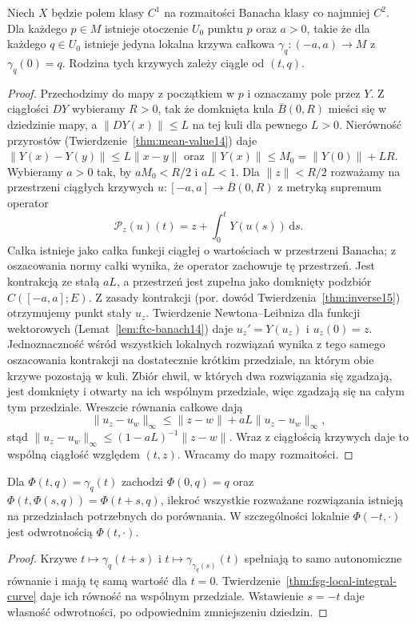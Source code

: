 \begin{twierdzenie}
\label{thm:fsg-local-integral-curve}
Niech $X$ będzie polem klasy $C^1$ na rozmaitości
Banacha klasy co najmniej $C^2$. Dla każdego $p\in M$
istnieje otoczenie $U_0$ punktu $p$ oraz $a>0$,
takie że dla każdego $q\in U_0$ istnieje jedyna lokalna
krzywa całkowa $\gamma_q:(-a,a)\to M$ z $\gamma_q(0)=q$.
Rodzina tych krzywych zależy ciągle od $(t,q)$.
\end{twierdzenie}
\begin{proof}
Przechodzimy do mapy z początkiem w $p$ i oznaczamy
pole przez $Y$. Z ciągłości $DY$ wybieramy $R>0$,
tak że domknięta kula $\overline B(0,R)$ mieści się
w dziedzinie mapy, a $\|DY(x)\|\le L$ na tej kuli
dla pewnego $L>0$. Nierówność przyrostów
(Twierdzenie~\ref{thm:mean-value14}) daje
$\|Y(x)-Y(y)\|\le L\|x-y\|$ oraz
$\|Y(x)\|\le M_0=\|Y(0)\|+LR$.
Wybieramy $a>0$ tak, by $aM_0<R/2$ i $aL<1$.
Dla $\|z\|<R/2$ rozważamy na przestrzeni ciągłych
krzywych $u:[-a,a]\to\overline B(0,R)$ z metryką
supremum operator
\[
 \mathcal P_z(u)(t)=z+\int_0^t Y(u(s))\,\mathrm ds.
\]
Całka istnieje jako całka funkcji ciągłej o wartościach
w przestrzeni Banacha; z oszacowania normy całki wynika,
że operator zachowuje tę przestrzeń. Jest kontrakcją
ze stałą $aL$, a przestrzeń jest zupełna jako domknięty
podzbiór $C([-a,a];E)$. Z zasady kontrakcji
(por. dowód Twierdzenia~\ref{thm:inverse15}) otrzymujemy
punkt stały $u_z$. Twierdzenie Newtona--Leibniza
dla funkcji wektorowych (Lemat~\ref{lem:ftc-banach14})
daje $u_z'=Y(u_z)$ i $u_z(0)=z$.
Jednoznaczność wśród wszystkich lokalnych rozwiązań
wynika z tego samego oszacowania kontrakcji na
dostatecznie krótkim przedziale, na którym obie krzywe
pozostają w kuli. Zbiór chwil, w których dwa rozwiązania
się zgadzają, jest domknięty i otwarty na ich wspólnym
przedziale, więc zgadzają się na całym tym przedziale.
Wreszcie równania całkowe dają
\[
 \|u_z-u_w\|_\infty
 \le \|z-w\|+aL\|u_z-u_w\|_\infty,
\]
stąd $\|u_z-u_w\|_\infty\le(1-aL)^{-1}\|z-w\|$.
Wraz z ciągłością krzywych daje to wspólną ciągłość
względem $(t,z)$. Wracamy do mapy rozmaitości.
\end{proof}

\begin{wniosek}
\label{cor:fsg-flow-law}
Dla $\Phi(t,q)=\gamma_q(t)$ zachodzi $\Phi(0,q)=q$ oraz
$\Phi(t,\Phi(s,q))=\Phi(t+s,q)$, ilekroć wszystkie
rozważane rozwiązania istnieją na przedziałach
potrzebnych do porównania. W szczególności lokalnie
$\Phi(-t,\cdot)$ jest odwrotnością $\Phi(t,\cdot)$.
\end{wniosek}
\begin{proof}
Krzywe $t\mapsto\gamma_q(t+s)$ i
$t\mapsto\gamma_{\gamma_q(s)}(t)$ spełniają to samo
autonomiczne równanie i mają tę samą wartość dla $t=0$.
Twierdzenie~\ref{thm:fsg-local-integral-curve} daje ich
równość na wspólnym przedziale. Wstawienie $s=-t$
daje własność odwrotności, po odpowiednim zmniejszeniu
dziedzin.
\end{proof}

